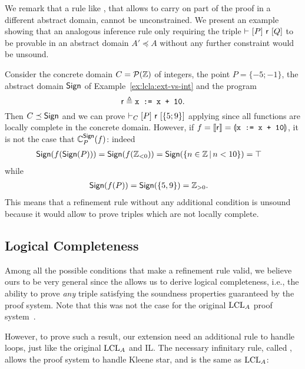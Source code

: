 We remark that a rule like , that allows to carry on part of the proof in a different abstract domain, cannot be unconstrained. We present an example showing that an analogous inference rule only requiring the triple $\vdash_{}\nobreak[P]~\mathsf{r}~[Q]$ to be provable in an abstract domain $A' \preceq A$ without any further constraint would be unsound.
\begin{example}
	Consider the concrete domain $C = \mathcal{P}(\mathbb{Z})$ of integers, the point $P = \{ -5; -1 \}$, the abstract domain $\mathsf{Sign}$ of Example~\ref{ex:lcla:ext-vs-int} and the program
	\[
	\mathsf{r} \triangleq \texttt{x := x + 10} .
	\]
	Then $C \preceq \mathsf{Sign}$ and we can prove $\vdash_{C}\nobreak[P]~\mathsf{r}~[\{ 5; 9 \}]$ applying  since all functions are locally complete in the concrete domain. However, if $f = \llbracket\mathsf{r}\rrbracket = \llparenthesis\texttt{x := x + 10}\rrparenthesis$, it is not the case that $\mathbb{C}^{\mathsf{Sign}}_{P}(f)$: indeed
	\begin{align*}
		\mathsf{Sign} (f (\mathsf{Sign}(P))) & = \mathsf{Sign} (f(\mathbb{Z}_{< 0})) = \mathsf{Sign}(\{ n \in \mathbb{Z} \,\vert\, n < 10 \}) = \top
	\end{align*}
	while
	\begin{align*}
		\mathsf{Sign}(f(P)) & = \mathsf{Sign}(\{ 5, 9 \}) = \mathbb{Z}_{> 0}.
	\end{align*}
	This means that a refinement rule without any additional condition is unsound because it would allow to prove triples which are not locally complete.
\end{example}

\subsection{Logical Completeness}\label{sec:logical-completeness}
Among all the possible conditions that make a refinement rule valid, we believe ours to be very general since the  allows us to derive logical completeness, i.e., the ability to prove \emph{any} triple satisfying the soundness properties guaranteed by the proof system. Note that this was not the case for the original $\text{LCL}_A$ proof system~\cite[§5.2]{BGGR21}.

However, to prove such a result, our extension need an additional rule to handle loops, just like the original $\text{LCL}_A$ and IL.
The necessary infinitary rule, called , allows the proof system to handle Kleene star, and is the same as $\text{LCL}_A$:

